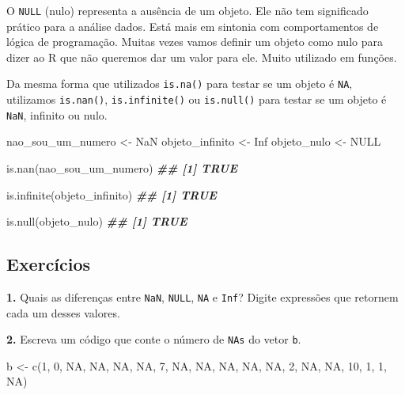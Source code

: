 \documentclass[
]{book}
\newenvironment{Shaded}{\begin{snugshade}}{\end{snugshade}}
\newcommand{\ConstantTok}[1]{\textcolor[rgb]{0.00,0.00,0.00}{#1}}
\newcommand{\DecValTok}[1]{\textcolor[rgb]{0.00,0.00,0.81}{#1}}
\newcommand{\DocumentationTok}[1]{\textcolor[rgb]{0.56,0.35,0.01}{\textbf{\textit{#1}}}}
\newcommand{\FunctionTok}[1]{\textcolor[rgb]{0.00,0.00,0.00}{#1}}
\newcommand{\NormalTok}[1]{#1}
\newcommand{\OtherTok}[1]{\textcolor[rgb]{0.56,0.35,0.01}{#1}}
\begin{document}
O \texttt{NULL} (nulo) representa a ausência de um objeto. Ele não tem significado prático para a análise dados. Está mais em sintonia com comportamentos de lógica de programação. Muitas vezes vamos definir um objeto como nulo para dizer ao R que não queremos dar um valor para ele. Muito utilizado em funções.

Da mesma forma que utilizados \texttt{is.na()} para testar se um objeto é \texttt{NA}, utilizamos \texttt{is.nan()}, \texttt{is.infinite()} ou \texttt{is.null()} para testar se um objeto é \texttt{NaN}, infinito ou nulo.

\begin{Shaded}
\begin{Highlighting}[]
\NormalTok{nao\_sou\_um\_numero }\OtherTok{\textless{}{-}} \ConstantTok{NaN}
\NormalTok{objeto\_infinito }\OtherTok{\textless{}{-}} \ConstantTok{Inf}
\NormalTok{objeto\_nulo }\OtherTok{\textless{}{-}} \ConstantTok{NULL}

\FunctionTok{is.nan}\NormalTok{(nao\_sou\_um\_numero)}
\DocumentationTok{\#\# [1] TRUE}

\FunctionTok{is.infinite}\NormalTok{(objeto\_infinito)}
\DocumentationTok{\#\# [1] TRUE}

\FunctionTok{is.null}\NormalTok{(objeto\_nulo)}
\DocumentationTok{\#\# [1] TRUE}
\end{Highlighting}
\end{Shaded}

\hypertarget{exercuxedcios-5}{%
\subsection*{Exercícios}\label{exercuxedcios-5}}

\textbf{1.} Quais as diferenças entre \texttt{NaN}, \texttt{NULL}, \texttt{NA} e \texttt{Inf}? Digite expressões que retornem cada um desses valores.

\textbf{2.} Escreva um código que conte o número de \texttt{NAs} do vetor \texttt{b}.

\begin{Shaded}
\begin{Highlighting}[]
\NormalTok{b }\OtherTok{\textless{}{-}} \FunctionTok{c}\NormalTok{(}\DecValTok{1}\NormalTok{, }\DecValTok{0}\NormalTok{, }\ConstantTok{NA}\NormalTok{, }\ConstantTok{NA}\NormalTok{, }\ConstantTok{NA}\NormalTok{, }\ConstantTok{NA}\NormalTok{, }\DecValTok{7}\NormalTok{, }\ConstantTok{NA}\NormalTok{, }\ConstantTok{NA}\NormalTok{, }\ConstantTok{NA}\NormalTok{, }\ConstantTok{NA}\NormalTok{, }\ConstantTok{NA}\NormalTok{, }\DecValTok{2}\NormalTok{, }\ConstantTok{NA}\NormalTok{, }\ConstantTok{NA}\NormalTok{, }\DecValTok{10}\NormalTok{, }\DecValTok{1}\NormalTok{, }\DecValTok{1}\NormalTok{, }\ConstantTok{NA}\NormalTok{)}
\end{Highlighting}
\end{Shaded}
\end{document}
